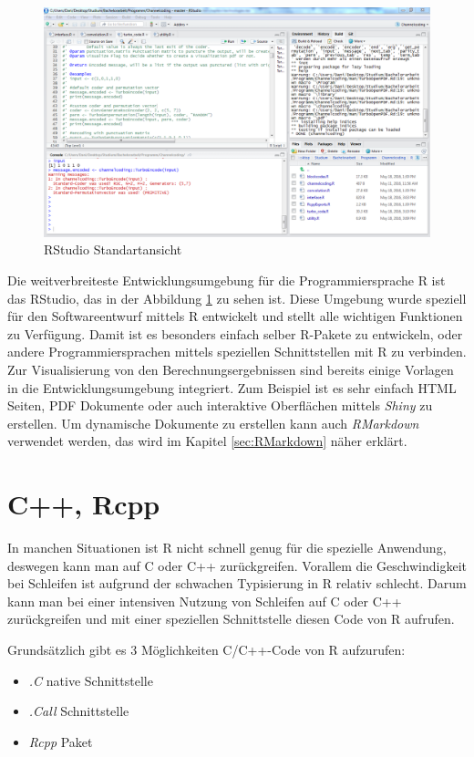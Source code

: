 \begin{figure}
\centering
\includegraphics[width=\ScaleIfNeeded]{pictures/RStudio}
\caption{RStudio Standartansicht}
\label{pic:RStudio}
\end{figure}
Die weitverbreiteste Entwicklungsumgebung für die Programmiersprache R ist das RStudio, das in der Abbildung \ref{pic:RStudio} zu sehen ist. Diese Umgebung wurde speziell für den Softwareentwurf mittels R entwickelt und stellt alle wichtigen Funktionen zu Verfügung. Damit ist es besonders einfach selber R-Pakete zu entwickeln, oder andere Programmiersprachen mittels speziellen Schnittstellen mit R zu verbinden. Zur Visualisierung von den Berechnungsergebnissen sind bereits einige Vorlagen in die Entwicklungsumgebung integriert. Zum Beispiel ist es sehr einfach HTML Seiten, PDF Dokumente oder auch interaktive Oberflächen mittels \emph{Shiny} zu erstellen. Um dynamische Dokumente zu erstellen kann auch \emph{RMarkdown} verwendet werden, das wird im Kapitel \ref{sec:RMarkdown} näher erklärt.
\section{C++, Rcpp}
\label{sec:Rcpp}
In manchen Situationen ist R nicht schnell genug für die spezielle Anwendung, deswegen kann man auf C oder C++ zurückgreifen. Vorallem die Geschwindigkeit bei Schleifen ist aufgrund der schwachen Typisierung in R relativ schlecht. Darum kann man bei einer intensiven Nutzung von Schleifen auf C oder C++ zurückgreifen und mit einer speziellen Schnittstelle diesen Code von R aufrufen.

Grundsätzlich gibt es 3 Möglichkeiten C/C++-Code von R aufzurufen:
\begin{itemize}
	\item \emph{.C} native Schnittstelle
	\item \emph{.Call} Schnittstelle
	\item \emph{Rcpp} Paket
\end{itemize}

